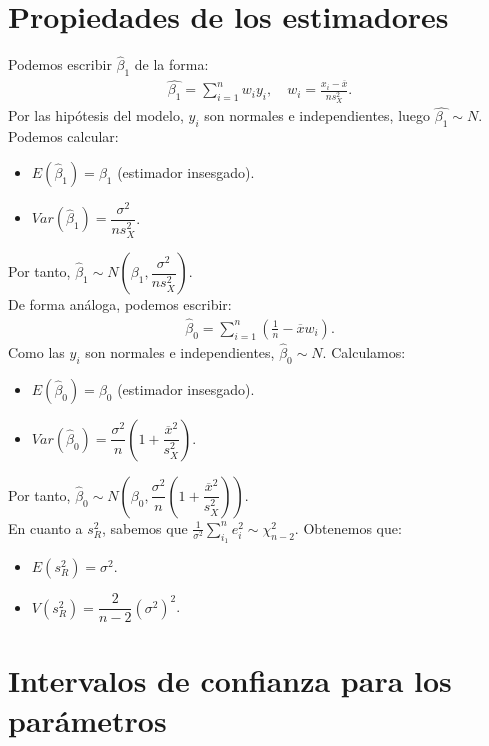 \section{Propiedades de los estimadores}

\noindent Podemos escribir $\widehat{\beta}_1$ de la forma:
\begin{align*}
    \hat{\beta_1} = \sum_{i=1}^n w_iy_i, \quad w_i = \frac{x_i - \overline{x}}{ns_X^2}.
\end{align*}
Por las hipótesis del modelo, $y_i$ son normales e independientes, luego $\hat{\beta_1} \sim N$.
Podemos calcular:

\begin{itemize}
    \item $E(\widehat{\beta}_1) = \beta_1$ (estimador insesgado).
    \item $Var(\widehat{\beta}_1) = \dfrac{\sigma^2}{ns_X^2}$.
\end{itemize}
Por tanto, $\widehat{\beta}_1 \sim N\left(\beta_1, \dfrac{\sigma^2}{ns_X^2}\right)$.
\\
\newline
De forma análoga, podemos escribir:
\begin{align*}
    \widehat{\beta}_0 = \sum_{i=1}^n \left(\frac{1}{n} - \overline{x}w_i\right).
\end{align*}
Como las $y_i$ son normales e independientes, $\widehat{\beta}_0 \sim N$.
Calculamos:

\begin{itemize}
    \item $E(\widehat{\beta}_0) = \beta_0$ (estimador insesgado).
    \item $Var(\widehat{\beta}_0) = \dfrac{\sigma^2}{n} \left(1 + \dfrac{\overline{x}^2}{s_X^2}\right)$.
\end{itemize}
Por tanto, $\widehat{\beta}_0 \sim N\left(\beta_0, \dfrac{\sigma^2}{n} \left(1 + \dfrac{\overline{x}^2}{s_X^2}\right)\right)$.
\\
\newline
En cuanto a $s_R^2$, sabemos que $\frac{1}{\sigma^2} \sum_{i_1}^n e_i^2 \sim \chi^2_{n-2}$.
Obtenemos que:
\begin{itemize}
    \item $E(s_R^2) = \sigma^2$.
    \item $V(s_R^2) = \dfrac{2}{n-2} (\sigma^2)^2$.
\end{itemize}

\section{Intervalos de confianza para los parámetros}

